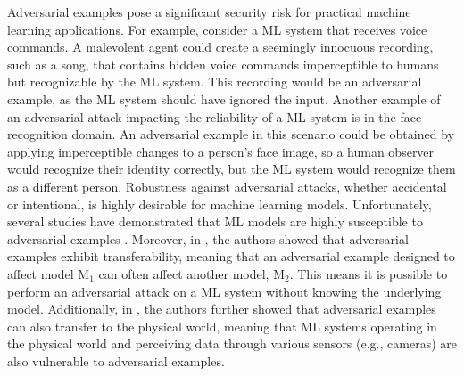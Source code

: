 Adversarial examples pose a significant security risk for practical machine learning applications. For example, consider a \acs{ML} system that receives voice commands. A malevolent agent could create a seemingly innocuous recording, such as a song, that contains hidden voice commands imperceptible to humans but recognizable by the \acs{ML} system. This recording would be an adversarial example, as the \acs{ML} system should have ignored the input. Another example of an adversarial attack impacting the reliability of a \acs{ML} system is in the face recognition domain. An adversarial example in this scenario could be obtained by applying imperceptible changes to a person's face image, so a human observer would recognize their identity correctly, but the \acs{ML} system would recognize them as a different person. Robustness against adversarial attacks, whether accidental or intentional, is highly desirable for machine learning models. Unfortunately, several studies have demonstrated that ML models are highly susceptible to adversarial examples \cite{Dalvi04, szegedy2014, goodfellow2015, kurakin2018}. Moreover, in \cite{szegedy2014}, the authors showed that adversarial examples exhibit transferability, meaning that an adversarial example designed to affect model M$_1$ can often affect another model, M$_2$. This means it is possible to perform an adversarial attack on a \acs{ML} system without knowing the underlying model. Additionally, in \cite{kurakin2018}, the authors further showed that adversarial examples can also transfer to the physical world, meaning that \acs{ML} systems operating in the physical world and perceiving data through various sensors (e.g., cameras) are also vulnerable to adversarial examples.

